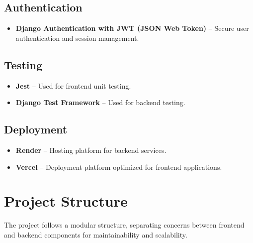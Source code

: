 \documentclass[a4paper,12pt]{article}
\begin{document}
\subsection{Authentication}
\begin{itemize}
    \item \textbf{Django Authentication with JWT (JSON Web Token)} – Secure user authentication and session management.
\end{itemize}

\subsection{Testing}
\begin{itemize}
    \item \textbf{Jest} – Used for frontend unit testing.
    \item \textbf{Django Test Framework} – Used for backend testing.
\end{itemize}

\subsection{Deployment}
\begin{itemize}
    \item \textbf{Render} – Hosting platform for backend services.
    \item \textbf{Vercel} – Deployment platform optimized for frontend applications.
\end{itemize}

\section{Project Structure}

The project follows a modular structure, separating concerns between frontend and backend components for maintainability and scalability.
\end{document}
